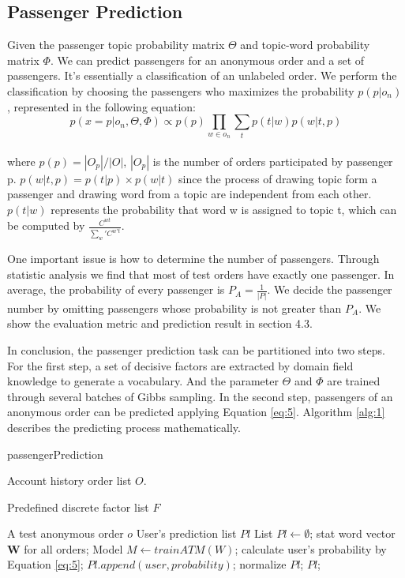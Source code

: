 \documentclass{llncs}
\begin{document}
\subsection{Passenger Prediction}
Given the passenger topic probability matrix $\Theta$ and topic-word probability matrix $\Phi$. We can predict passengers for an anonymous order and a set of passengers. It's essentially a classification of an unlabeled order\cite{shanshan:unpopular}. We perform the classification by choosing the passengers who maximizes the probability $p(p|o_n)$, represented in the following equation:\\
\begin{equation}
\label{eq:5}
p(x=p|o_n,\Theta,\Phi) \propto p(p)\prod_{w \in o_n}\sum_t p(t|w)p(w|t,p)
\end{equation}\\
where $p(p) = |O_p| / |O|$, $|O_p|$ is the number of orders participated by passenger p. $p(w|t,p) = p(t|p) \times p(w|t)$ since the process of drawing topic form a passenger and drawing word from a topic are independent from each other. $p(t|w)$ represents the probability that word w is assigned to topic t, which can be computed by $\frac{C^{wt}}{\sum_w'C^{w't}}$.\par
One important issue is how to determine the number of passengers. Through statistic analysis we find that most of test orders have exactly one passenger. In average, the probability of every passenger is $P_A = \frac{1}{|P|}$. We decide the passenger number by omitting passengers whose probability is not greater than $P_A$. We show the evaluation metric and prediction result in section 4.3.\par
In conclusion, the passenger prediction task can be partitioned into two steps. For the first step, a set of decisive factors are extracted by domain field knowledge to generate a vocabulary. And the parameter $\Theta$ and $\Phi$ are trained through several batches of Gibbs sampling. In the second step, passengers of an anonymous order can be predicted applying Equation \ref{eq:5}. Algorithm \ref{alg:1} describes the predicting process mathematically.\par


\begin{algorithm}[htb]
\caption{passengerPrediction}
\begin{algorithmic}[1]
\label{alg:1}
\REQUIRE
Account history order list $O$. \par
Predefined discrete factor list $F$ \par
A test anonymous order $o$
\ENSURE 
User's prediction list $Pl$
\STATE List $Pl \leftarrow \emptyset$;
\STATE stat word vector $\mathbf{W}$ for all orders;
\STATE Model $M \leftarrow trainATM(W)$;
\STATE calculate user's probability by Equation \ref{eq:5};
\STATE $Pl.append(user,probability)$;
\ENDIF
\ENDFOR
\STATE normalize $Pl$;
\RETURN $Pl$;
\end{algorithmic} 
\end{algorithm}
\end{document}
